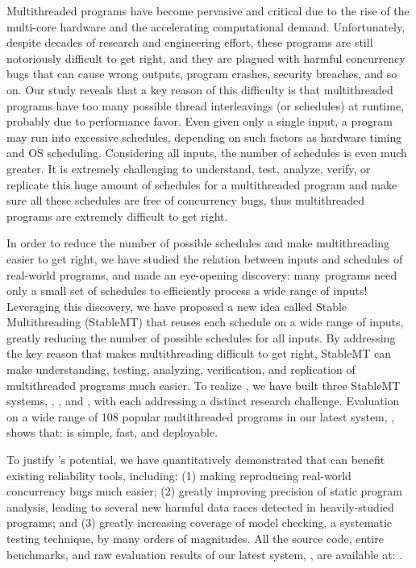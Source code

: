 Multithreaded programs have become pervasive and critical due to the rise of the
multi-core hardware and the accelerating computational demand.
Unfortunately, despite decades of research and engineering effort, these
programs are still notoriously difficult to get right, and they are plagued with
harmful concurrency bugs that can cause wrong outputs, program crashes, security
breaches, and so on. Our study reveals that a key reason of this difficulty is
that multithreaded programs have too many possible thread interleavings (or
schedules) at runtime, probably due to performance favor. Even given only a
single input, a program may run into excessive schedules, depending on such
factors as hardware timing and OS scheduling. Considering all inputs, the number
of schedules is even much greater. It is extremely challenging to understand,
test, analyze, verify, or replicate this huge amount of schedules for a
multithreaded program and make sure all these schedules are free of concurrency
bugs, thus multithreaded programs are extremely difficult to get right.

In order to reduce the number of possible schedules and make multithreading
easier to get right, we have studied the
relation between inputs and schedules of real-world programs, and made an
eye-opening discovery: many programs need only a small set of schedules to
efficiently process a wide range of inputs! Leveraging this discovery, we have
proposed a new idea called Stable Multithreading (StableMT) that reuses each
schedule on a wide range of inputs, greatly reducing the number of possible
schedules for all inputs. By addressing the key reason that makes multithreading
difficult to get right, StableMT can make understanding,
testing, analyzing, verification, and replication of multithreaded programs much
easier. To realize \smt, we have built three StableMT systems, \tern,
\peregrine, and \parrot, with each addressing a distinct research challenge.
Evaluation on a wide range of 108 popular multithreaded programs in
our latest \smt system, \parrot, shows that: \smt is simple, fast, and
deployable.

To justify \smt's potential, we have quantitatively demonstrated that \smt can
benefit existing reliability tools, including: (1) making reproducing
real-world concurrency bugs much easier;  (2) greatly improving precision of
static program analysis, leading to several new harmful data races detected in
heavily-studied programs; and (3) greatly increasing coverage of model checking,
a systematic testing technique, by many orders of magnitudes. All the source
code, entire benchmarks, and raw evaluation results of our latest \smt system,
\parrot, are available at: \github.

